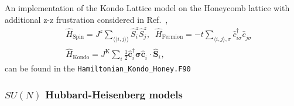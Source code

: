 An implementation of the Kondo Lattice model on the  Honeycomb lattice with additional z-z frustration considered in Ref.~\cite{SatoT17_1}, 
\begin{eqnarray}
& & \hat{H}_{\text{Spin}} = J^{z}\sum_{\langle \langle i,j \rangle \rangle}\hat{S}_{i}^{z}\hat{S}_{j}^{z},  \; \;  \hat{H}_{\text{Fermion}} = -t\sum_{\langle i,j \rangle,\sigma}\hat{c}_{i\sigma}^\dagger \hat{c}^{\phantom\dagger} _{j\sigma}  \nonumber \\ 
 & & \hat{H}_{\text{Kondo}}  =  
  J^{\text{K}} \sum_{i}    \frac{1}{2} \hat{\pmb{c}}^{\dagger}_{i} \pmb{\sigma}\hat{\pmb{c}}^{\phantom\dagger}_{i} \cdot \hat{{\bm S}}^{\phantom\dagger} _{i} ,
\end{eqnarray}
can be found in  the \texttt{Hamiltonian\_Kondo\_Honey.F90}

\subsubsection{$SU(N)$ Hubbard-Heisenberg models}

